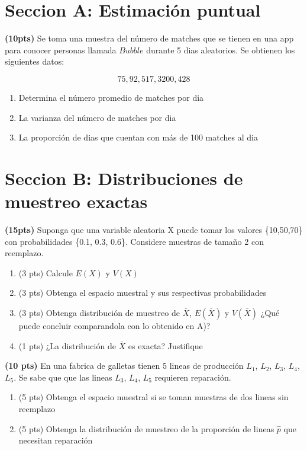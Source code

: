 \documentclass[addpoints]{exam}
\theoremstyle{mytheor}
\begin{document}
\begin{questions} 

\section*{Seccion A: Estimación puntual}

\question \textbf{(10pts)} Se toma una muestra del número de matches que se tienen en una app para conocer personas llamada $Bubble$ durante 5 dias aleatorios. Se obtienen los siguientes datos:

$$75, 92, 517, 3200, 428$$

\begin{enumerate}[label=\Alph*)]
\item Determina el número promedio de matches por dia
\item La varianza del número de matches por dia
\item La proporción de dias que cuentan con más de 100 matches al dia
\end{enumerate}

\section*{Seccion B: Distribuciones de muestreo exactas}

\question \textbf{(15pts)} Suponga que una variable aleatoria X puede tomar los valores \{10,50,70\} con probabilidades \{0.1, 0.3, 0.6\}. Considere muestras de tamaño 2 con reemplazo.
  
  \begin{enumerate}
  \item (3 pts) Calcule $E(X)$ y $V(X)$
  \item (3 pts) Obtenga el espacio muestral y sus respectivas probabilidades
  \item (3 pts) Obtenga distribución de muestreo de $\overline{X}$, $E(\overline{X})$ y $V(\overline{X})$ ¿Qué puede concluir comparandola con lo obtenido en A)?
  \item (1 pts) ¿La distribución de $\overline{X}$ es exacta? Justifique
  \end{enumerate}

 \question \textbf{(10 pts)} En una fabrica de galletas tienen 5 lineas de producción $L_1$, $L_2$, $L_3$, $L_4$, $L_5$. Se sabe que que las lineas $L_3$, $L_4$, $L_5$ requieren reparación.

  \begin{enumerate}
  \item (5 pts) Obtenga el espacio muestral si se toman muestras de dos lineas sin reemplazo
  \item (5 pts) Obtenga la distribución de muestreo de la proporción de lineas $\hat{p}$ que necesitan reparación
  \end{enumerate}


\end{questions}
\end{document}
